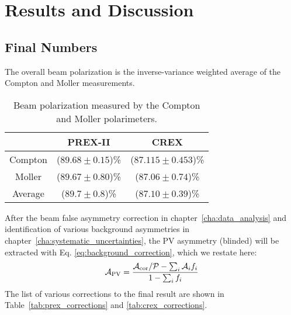 \chapter{Results and Discussion}

\section{Final Numbers}

\begin{comment}
    Measured asymmetry 
    $\downarrow$
    correct for Coulomb distortions 
    $\downarrow$
    Weak density at one $Q^2$
    $\downarrow$
    small correction for $G_E^n$, $G_E^s$
    $\downarrow$
    Neutron density at one $Q^2$
    $\downarrow$
    assume suface thickness good to 25\% (MFT)
    $\downarrow$
    $R_n$

\end{comment}
The overall beam polarization is the inverse-variance weighted average of the Compton
and Moller measurements.
\begin{table}[!h]
    \centering
    \begin{tabular}{c | c c}
	\hline
	    & PREX-II	& CREX	\\
	\hline
	Compton	& ($89.68 \pm 0.15$)\%  & ($87.115 \pm 0.453$)\%	\\
	Moller	& ($89.67 \pm 0.80$)\%	& ($87.06 \pm 0.74$)\%  \\
	\hline
	Average	& ($89.7 \pm 0.8$)\%	& ($87.10 \pm 0.39$)\%	\\
	\hline
    \end{tabular}
    \caption{Beam polarization measured by the Compton and Moller polarimeters.}
\end{table}

After the beam false asymmetry correction in chapter~\ref{cha:data_analysis} and
identification of various background asymmetries in chapter~\ref{cha:systematic_uncertainties}, 
the PV asymmetry (blinded) will be extracted with
Eq. \ref{eq:background_correction}, which we restate here:
\begin{equation*}
    \mathcal{A}_{\text{PV}} = \frac{\mathcal{A}_{\text{cor}}/\mathcal{P} - \sum_i \mathcal{A}_i f_i}{1 - \sum_i f_i}
\end{equation*}
The list of various corrections to the final result are shown in 
Table~\ref{tab:prex_corrections} and \ref{tab:crex_corrections}.

